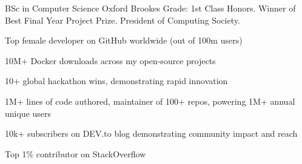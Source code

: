 \documentclass[]{resume-format}
\begin{document}

\begin{cventries}
    \cventry
    { BSc in Computer Science }
    { Oxford Brookes }
    {}
    {}
    {Grade: 1st Class Honors. Winner of Best Final Year Project Prize. President of Computing Society.}
\end{cventries}



\vspace{0.5mm}  %
\begin{cvskills}
\end{cvskills}




\vspace{0.5mm}
\begin{cvachievements}
\setlength{\itemsep}{0mm}
  \item { Top female developer on GitHub worldwide (out of 100m users) \href{ https://gitstar-ranking.com/Lissy93 }{\scriptsize\color{lightgray}\faLink} }
  \item { 10M+ Docker downloads across my open-source projects \href{ https://hub.docker.com/u/lissy93 }{\scriptsize\color{lightgray}\faLink} }
  \item { 10+ global hackathon wins, demonstrating rapid innovation \href{ https://notes.aliciasykes.com/p/0s5s3uOtKj }{\scriptsize\color{lightgray}\faLink} }
  \item { 1M+ lines of code authored, maintainer of 100+ repos, powering 1M+ annual unique users \href{ https://codestats.net/users/alicia }{\scriptsize\color{lightgray}\faLink} }
  \item { 10k+ subscribers on DEV.to blog demonstrating community impact and reach \href{ https://dev.to/lissy93 }{\scriptsize\color{lightgray}\faLink} }
  \item { Top 1\% contributor on StackOverflow \href{ https://stackoverflow.com/users/979052/alicia-sykes }{\scriptsize\color{lightgray}\faLink} }
\end{cvachievements}
\end{document}
